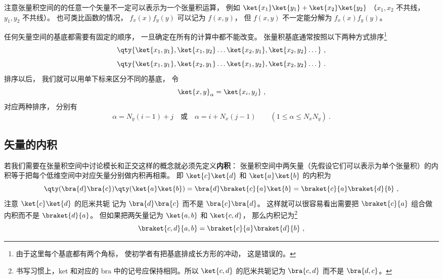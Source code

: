 注意张量积空间的的任意一个矢量不一定可以表示为一个张量积运算， 例如 $\ket{x_1}\ket{y_1} + \ket{x_2}\ket{y_2}$ （$x_1, x_2$ 不共线， $y_1, y_2$ 不共线）。 也可类比函数的情况， $f_x(x)f_y(y)$ 可以记为 $f(x, y)$， 但 $f(x, y)$ 不一定能分解为 $f_x(x)f_y(y)$。

任何矢量空间的基底都需要有固定的顺序， 一旦确定在所有的计算中都不能改变。 张量积基底通常按照以下两种方式排序\footnote{由于这里每个基底都有两个角标， 使初学者有把基底排成长方形的冲动， 这是错误的。}
\begin{equation}\label{eq_DirPro_4}
\qty{\ket{x_1, y_1}, \ket{x_1, y_2}\dots  \ket{x_2, y_1}, \ket{x_2, y_2}\dots }~,
\end{equation}
\begin{equation}\label{eq_DirPro_5}
\qty{\ket{x_1, y_1}, \ket{x_2, y_1}\dots  \ket{x_1, y_2}, \ket{x_2, y_2}\dots }~.
\end{equation}
排序以后， 我们就可以用单下标来区分不同的基底， 令
\begin{equation}
\ket{x, y}_\alpha = \ket{x_i, y_j}~,
\end{equation}
对应两种排序， 分别有
\begin{equation}
\alpha = N_y (i-1) + j
\quad \text{或} \quad
\alpha = i + N_x (j-1)
\qquad 
(1 \leqslant \alpha \leqslant N_xN_y)~.
\end{equation}

\subsection{矢量的内积}

若我们需要在张量积空间中讨论模长和正交这样的概念就必须先定义\textbf{内积}： 张量积空间中两矢量（先假设它们可以表示为单个张量积）的内积等于把每个低维空间中对应矢量分别做内积再相乘。 即 $\ket{c}\ket{d}$ 和 $\ket{a}\ket{b}$ 的内积为
\begin{equation}
\qty(\bra{d}\bra{c})\qty(\ket{a}\ket{b})
= \bra{d}\braket{c}{a}\ket{b}
= \braket{c}{a}\braket{d}{b}~,
\end{equation}
注意 $\ket{c}\ket{d}$ 的厄米共轭%
记为 $\bra{d}\bra{c}$ 而不是 $\bra{c}\bra{d}$。 这样就可以很容易看出需要把 $\braket{c}{a}$ 组合做内积而不是 $\braket{d}{a}$。 但如果把两矢量记为 $\ket{a, b}$ 和 $\ket{c, d}$， 那么内积记为\footnote{书写习惯上，ket 和对应的 bra 中的记号应保持相同。所以 $\ket{c, d}$ 的厄米共轭记为 $\bra{c, d}$ 而不是 $\bra{d, c}$。}
\begin{equation}
\braket{c, d}{a, b} = \braket{c}{a}\braket{d}{b}~,
\end{equation}

